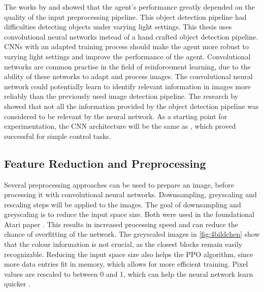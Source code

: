 The works by \autocite{merlin_flach} and \autocite{maximilian} showed that the agent's performance greatly depended on the quality of the input preprocessing pipeline. This object detection pipeline had difficulties detecting objects under varying light settings. This thesis uses convolutional neural networks instead of a hand crafted object detection pipeline. CNNs with an adapted training process should make the agent more robust to varying light settings and improve the performance of the agent.
Convolutional networks are common practise in the field of reinforcement learning, due to the ability of these networks to adapt and process images. The convolutional neural network could potentially learn to identify relevant information in images more reliably than the previously used image detection pipeline. The research by \autocite{merlin_flach} showed that not all the information provided by the object detection pipeline was considered to be relevant by the neural network.
As a starting point for experimentation, the CNN architecture will be the same as \autocite{human_level_control}, which proved successful for simple control tasks.




\subsection{Feature Reduction and Preprocessing}

Several preprocessing approaches can be used to prepare an image, before processing it with convolutional neural networks. Downsampling, greyscaling and rescaling steps will be applied to the images. The goal of downsampling and greyscaling is to reduce the input space size. Both were used in the foundational Atari paper \autocite{atari}. This results in increased processing speed and can reduce the chance of overfitting of the network. The greyscaled images in \ref{fig:4bildchen} show that the colour information is not crucial, as the closest blocks remain easily recognizable. Reducing the input space size also helps the PPO algorithm, since more data entries fit in memory, which allows for more efficient training. Pixel values are rescaled to between 0 and 1, which can help the neural network learn quicker \autocite{jason}.

